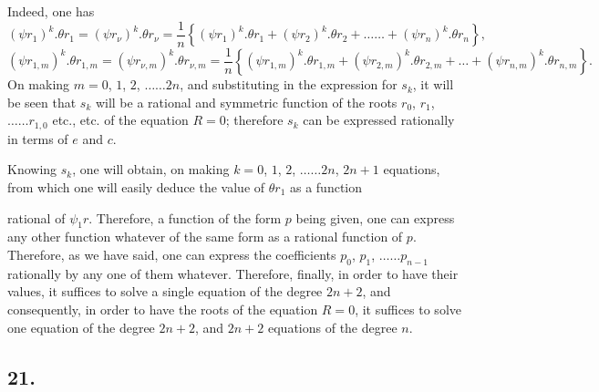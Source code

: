 \documentclass{article}
\begin{document}
Indeed, one has
\[ (\psi r_{1})^{k}.\theta r_{1}=(\psi r_{\nu})^{k}.\theta r_{\nu}=\frac{1}{n}\left\{(\psi r_{1})^{k}.\theta r_{1}+(\psi r_{2})^{k}.\theta r_{2}+\ldots\ldots+(\psi r_{n})^{k}.\theta r_{n}\right\}, \]
\[ (\psi r_{1,m})^{k}.\theta r_{1,m}=(\psi r_{\nu,m})^{k}.\theta r_{\nu,m}=\frac{1}{n}\left\{(\psi r_{1,m})^{k}.\theta r_{1,m}+(\psi r_{2,m})^{k}.\theta r_{2,m}+\ldots+(\psi r_{n,m})^{k}.\theta r_{n,m}\right\}. \]
On making $m=0$, $1$, $2$, $\ldots\ldots 2n$, and substituting in the expression for $s_{k}$, it will be seen that $s_{k}$ will be a rational and symmetric function of the roots $r_{0}$, $r_{1}$, $\ldots\ldots r_{1,0}$ etc., etc. of the equation $R=0$; therefore $s_{k}$ can be expressed rationally in terms of $e$ and $c$.

Knowing $s_{k}$, one will obtain, on making $k=0$, $1$, $2$, $\ldots\ldots 2n$, $2n+1$ equations, from which one will easily deduce the value of $\theta r_{1}$ as a function

rational of $\psi_{1}r$. Therefore, a function of the form $p$ being given, one can express any other function whatever of the same form as a rational function of $p$. Therefore, as we have said, one can express the coefficients $p_{0}$, $p_{1}$, $\ldots\ldots p_{n-1}$ rationally by any one of them whatever. Therefore, finally, in order to have their values, it suffices to solve a single equation of the degree $2n+2$, and consequently, in order to have the roots of the equation $R=0$, it suffices to solve one equation of the degree $2n+2$, and $2n+2$ equations of the degree $n$.

\subsection*{21.}
\end{document}
